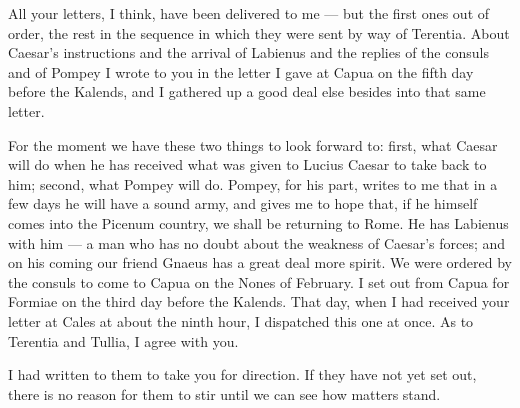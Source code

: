

 All your letters, I think, have been delivered to me --- but the first ones out of order, the rest in the sequence in which they were sent by way of Terentia. About Caesar's instructions and the arrival of Labienus and the replies of the consuls and of Pompey I wrote to you in the letter I gave at Capua on the fifth day before the Kalends, and I gathered up a good deal else besides into that same letter.

 For the moment we have these two things to look forward to: first, what Caesar will do when he has received what was given to Lucius Caesar to take back to him; second, what Pompey will do. Pompey, for his part, writes to me that in a few days he will have a sound army, and gives me to hope that, if he himself comes into the Picenum country, we shall be returning to Rome. He has Labienus with him --- a man who has no doubt about the weakness of Caesar's forces; and on his coming our friend Gnaeus has a great deal more spirit. We were ordered by the consuls to come to Capua on the Nones of February. I set out from Capua for Formiae on the third day before the Kalends. That day, when I had received your letter at Cales at about the ninth hour, I dispatched this one at once. As to Terentia and Tullia, I agree with you.

 I had written to them to take you for direction. If they have not yet set out, there is no reason for them to stir until we can see how matters stand.
